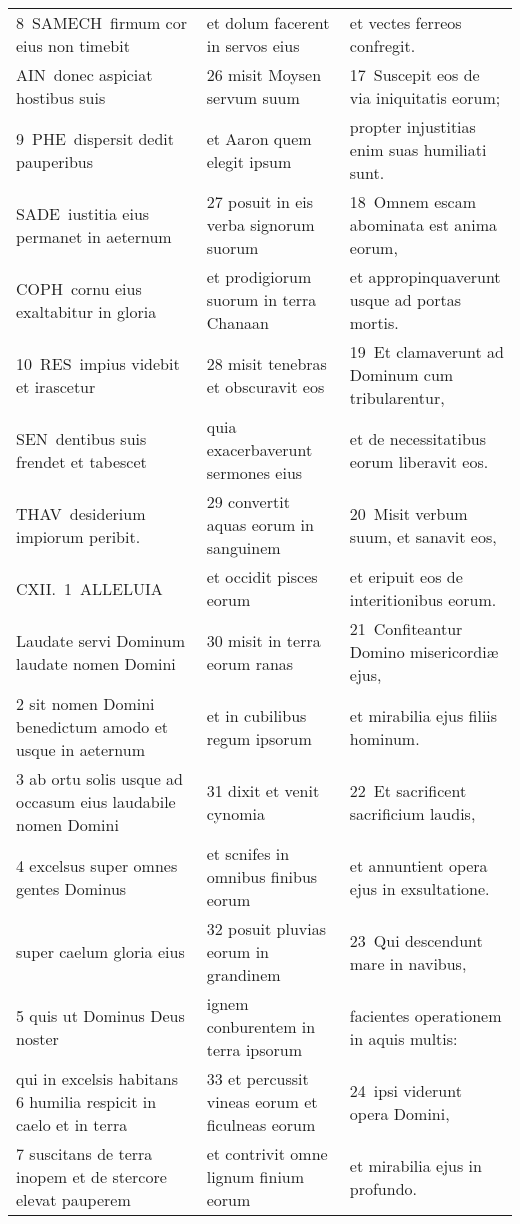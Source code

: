 \documentclass{article}
\begin{document}
\begin{longtable}{@{}p{}p{}p{}@{}}
8 SAMECH firmum cor eius non timebit	&	et dolum facerent in servos eius	&	et vectes ferreos confregit.	\\
AIN donec aspiciat hostibus suis	&	26 misit Moysen servum suum	&	17 Suscepit eos de via iniquitatis eorum;	\\
9 PHE dispersit dedit pauperibus	&	et Aaron quem elegit ipsum	&	propter injustitias enim suas humiliati sunt.	\\
SADE iustitia eius permanet in aeternum	&	27 posuit in eis verba signorum suorum	&	18 Omnem escam abominata est anima eorum,	\\
COPH cornu eius exaltabitur in gloria	&	et prodigiorum suorum in terra Chanaan	&	et appropinquaverunt usque ad portas mortis.	\\
10 RES impius videbit et irascetur	&	28 misit tenebras et obscuravit eos	&	19 Et clamaverunt ad Dominum cum tribularentur,	\\
SEN dentibus suis frendet et tabescet	&	quia exacerbaverunt sermones eius	&	et de necessitatibus eorum liberavit eos.	\\
THAV desiderium impiorum peribit.	&	29 convertit aquas eorum in sanguinem	&	20 Misit verbum suum, et sanavit eos,	\\
CXII. 1 ALLELUIA	&	et occidit pisces eorum	&	et eripuit eos de interitionibus eorum.	\\
Laudate servi Dominum laudate nomen Domini	&	30 misit in terra eorum ranas	&	21 Confiteantur Domino misericordiæ ejus,	\\
2 sit nomen Domini benedictum amodo et usque in aeternum	&	et in cubilibus regum ipsorum	&	et mirabilia ejus filiis hominum.	\\
3 ab ortu solis usque ad occasum eius laudabile nomen Domini	&	31 dixit et venit cynomia	&	22 Et sacrificent sacrificium laudis,	\\
4 excelsus super omnes gentes Dominus	&	et scnifes in omnibus finibus eorum	&	et annuntient opera ejus in exsultatione.	\\
super caelum gloria eius	&	32 posuit pluvias eorum in grandinem	&	23 Qui descendunt mare in navibus,	\\
5 quis ut Dominus Deus noster	&	ignem conburentem in terra ipsorum	&	facientes operationem in aquis multis:	\\
qui in excelsis habitans 6 humilia respicit in caelo et in terra	&	33 et percussit vineas eorum et ficulneas eorum	&	24 ipsi viderunt opera Domini,	\\
7 suscitans de terra inopem et de stercore elevat pauperem	&	et contrivit omne lignum finium eorum	&	et mirabilia ejus in profundo.	\\

\end{longtable}
\end{document}
